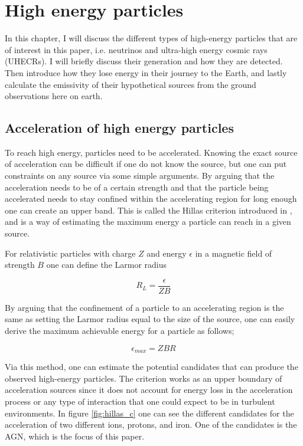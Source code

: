 \section{High energy particles}

In this chapter, I will discuss the different types of high-energy particles that are of interest in this paper, i.e. neutrinos and ultra-high energy cosmic rays (UHECRs).
I will briefly discuss their generation and how they are detected. Then introduce how they lose energy in their journey to the Earth, and lastly calculate the emissivity of their hypothetical sources from the ground 
observations here on earth. 

\subsection{Acceleration of high energy particles}

To reach high energy, particles need to be accelerated. 
Knowing the exact source of acceleration can be difficult if one do not know the source, but one can put constraints on any source via some simple arguments.
By arguing that the acceleration needs to be of a certain strength and that the particle being accelerated needs to stay confined within the accelerating region for long enough one can create an upper band.
This is called the Hillas criterion introduced in \cite{Hillas_1984}, and is a way of estimating the maximum energy a particle can reach in a given source.%

For relativistic particles with charge $Z$ and energy $\epsilon$ in a magnetic field of strength $B$ one can define the Larmor radius


\begin{equation}
    R_L = \frac{\epsilon}{ZB}
\end{equation}

By arguing that the confinement of a particle to an accelerating region is the same as setting the Larmor radius equal to the size of the source, one can 
easily derive the maximum achievable energy for a particle as follows;%

\begin{equation}
    \epsilon_{max} = ZBR
\end{equation}

Via this method, one can estimate the potential candidates that can produce the observed high-energy particles. 
The criterion works as an upper boundary of acceleration sources since it does not account for energy loss in the acceleration process or any type of interaction that one could expect to be in turbulent environments.
In figure \ref{fig:hillas_c} one can see the different candidates for the acceleration of two different ions, protons, and iron. One of the candidates is the AGN, which is the focus of this paper.

